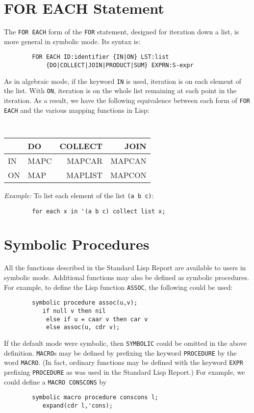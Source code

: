 \section{FOR EACH Statement}

The {\tt FOR EACH} form of the {\tt FOR} statement, designed for iteration
down a list, is more general in symbolic mode.  Its syntax is:

\begin{verbatim}
        FOR EACH ID:identifier {IN|ON} LST:list
            {DO|COLLECT|JOIN|PRODUCT|SUM} EXPRN:S-expr
\end{verbatim}

As in algebraic mode, if the keyword {\tt IN} is used, iteration is on
each element of the list.  With {\tt ON}, iteration is on the whole list
remaining at each point in the iteration.  As a result, we have the
following equivalence between each form of {\tt FOR EACH} and the various
mapping functions in Lisp:
\begin{center}
{\tt
\begin{tabular}{|l|lr r|} \hline
& DO & COLLECT & JOIN \\ \hline
        IN &   MAPC & MAPCAR & MAPCAN \\
        ON &   MAP &  MAPLIST & MAPCON \\ \hline
\end{tabular}}
\end{center}
{\it Example:} To list each element of the list {\tt (a b c)}:
\begin{verbatim}
        for each x in '(a b c) collect list x;
\end{verbatim}

\section{Symbolic Procedures}

All the functions described in the Standard Lisp Report are available to
users in symbolic mode. Additional functions may also be defined as
symbolic procedures. For example, to define the Lisp function {\tt ASSOC},
the following could be used:
\begin{verbatim}
        symbolic procedure assoc(u,v);
           if null v then nil
            else if u = caar v then car v
            else assoc(u, cdr v);
\end{verbatim}
\hypertarget{reserved:MACRO}{}
\hypertarget{reserved:EXPR}{}
If the default mode were symbolic, then {\tt SYMBOLIC} could be omitted in
the above definition. {\tt MACRO}s may be defined by
prefixing the keyword {\tt PROCEDURE} by the word {\tt MACRO}.
(In fact, ordinary functions may be defined with the keyword {\tt EXPR}
 prefixing {\tt PROCEDURE} as was used in the Standard Lisp
Report.) For example, we could define a {\tt MACRO CONSCONS} by
\begin{verbatim}
        symbolic macro procedure conscons l;
           expand(cdr l,'cons);
\end{verbatim}

